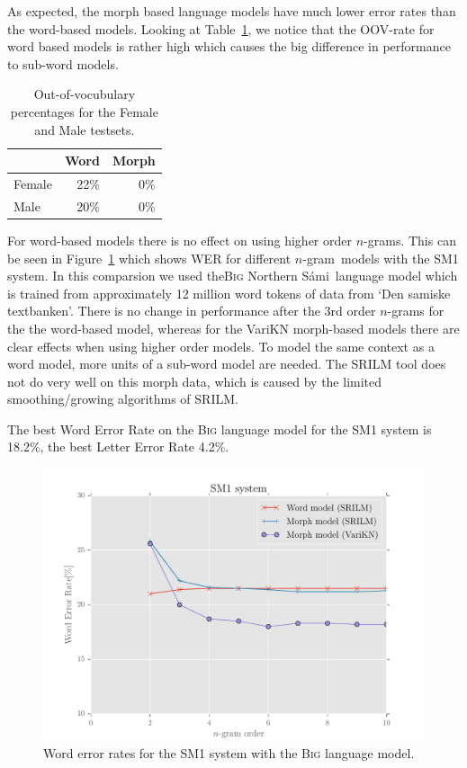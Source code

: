 \documentclass[b5paper]{article}
\newcommand{\ns}{Northern Sámi}
\newcommand{\ngram}{$n$-gram}
\newcommand{\ds}[1]{\textsc{#1}}
\begin{document}
As expected, the morph based language models have much lower error rates than the word-based models. Looking at Table~\ref{tbl:samioov}, we notice that the OOV-rate for word based models is rather high which causes the big difference in performance to sub-word models. %

\begin{table}[!h]
\centering
\begin{tabular}{lrr}
& Word & Morph\\\hline
Female &  22\% & 0\% \\
Male & 20\% & 0\%\\
\end{tabular}
\caption{Out-of-vocubulary percentages for the Female and Male testsets. \label{tbl:samioov}}
\end{table}


For word-based models there is no effect on using higher order \ngram s. This can be seen in Figure~\ref{fig:samiperf}  which shows WER for different \ngram\ models with the SM1 system. In this comparsion we used the\ds{Big} \ns\ language model which is trained from approximately 12 million word tokens of data from `Den samiske textbanken'. There is no change in performance after the 3rd order \ngram s for the the word-based model, whereas for the VariKN morph-based models there are clear effects when using higher order models. To model the same context as a word model, more units of a sub-word model are needed. The SRILM tool does not do very well on this morph data, which is caused by the limited smoothing/growing algorithms of SRILM. %

The best Word Error Rate on the \ds{Big} language model for the SM1 system is 18.2\%, the best Letter Error Rate 4.2\%. 

\begin{figure}
\centering
\includegraphics[width=.9\textwidth]{figures/sme1}
\caption{Word error rates for the SM1 system with the \ds{Big} language model.}\label{fig:samiperf}

\end{figure}
\end{document}
